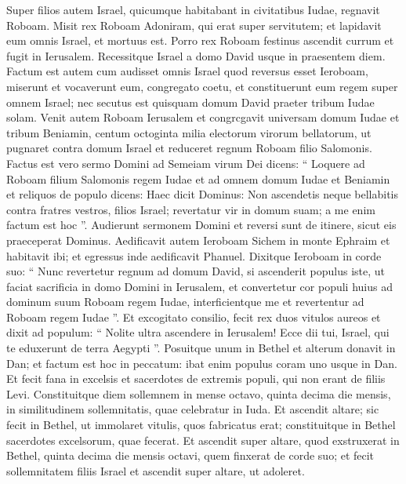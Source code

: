 \begin{biblechapter}
\begin{biblechapter}
\begin{biblechapter}
\begin{biblechapter}
\begin{biblechapter}
\begin{biblechapter}
\begin{biblechapter}
\begin{biblechapter}
\begin{biblechapter}
\begin{biblechapter}
\begin{biblechapter}
\begin{biblechapter}
\verse Super filios autem Israel, quicumque habitabant in civitatibus Iudae, regnavit Roboam. 
\verse Misit rex Roboam Adoniram, qui erat super servitutem; et lapidavit eum omnis Israel, et mortuus est. Porro rex Roboam festinus ascendit currum et fugit in Ierusalem. 
\verse Recessitque Israel a domo David usque in praesentem diem.
 \verse Factum est autem cum audisset omnis Israel quod reversus esset Ieroboam, miserunt et vocaverunt eum, congregato coetu, et constituerunt eum regem super omnem Israel; nec secutus est quisquam domum David praeter tribum Iudae solam.
 \verse Venit autem Roboam Ierusalem et congrcgavit universam domum Iudae et tribum Beniamin, centum octoginta milia electorum virorum bellatorum, ut pugnaret contra domum Israel et reduceret regnum Roboam filio Salomonis. 
\verse Factus est vero sermo Domini ad Semeiam virum Dei dicens: 
\verse “ Loquere ad Roboam filium Salomonis regem Iudae et ad omnem domum Iudae et Beniamin et reliquos de populo dicens: 
\verse Haec dicit Dominus: Non ascendetis neque bellabitis contra fratres vestros, filios Israel; revertatur vir in domum suam; a me enim factum est hoc ”. Audierunt sermonem Domini et reversi sunt de itinere, sicut eis praeceperat Dominus.
 \verse Aedificavit autem Ieroboam Sichem in monte Ephraim et habitavit ibi; et egressus inde aedificavit Phanuel.
 \verse Dixitque Ieroboam in corde suo: “ Nunc revertetur regnum ad domum David, 
 \verse si ascenderit populus iste, ut faciat sacrificia in domo Domini in Ierusalem, et convertetur cor populi huius ad dominum suum Roboam regem Iudae, interficientque me et revertentur ad Roboam regem Iudae ”. 
\verse Et excogitato consilio, fecit rex duos vitulos aureos et dixit ad populum: “ Nolite ultra ascendere in Ierusalem! Ecce dii tui, Israel, qui te eduxerunt de terra Aegypti ”. 
\verse Posuitque unum in Bethel et alterum donavit in Dan; 
\verse et factum est hoc in peccatum: ibat enim populus coram uno usque in Dan. 
\verse Et fecit fana in excelsis et sacerdotes de extremis populi, qui non erant de filiis Levi. 
 \verse Constituitque diem sollemnem in mense octavo, quinta decima die mensis, in similitudinem sollemnitatis, quae celebratur in Iuda. Et ascendit altare; sic fecit in Bethel, ut immolaret vitulis, quos fabricatus erat; constituitque in Bethel sacerdotes excelsorum, quae fecerat. 
\verse Et ascendit super altare, quod exstruxerat in Bethel, quinta decima die mensis octavi, quem finxerat de corde suo; et fecit sollemnitatem filiis Israel et ascendit super altare, ut adoleret.
 

\end{biblechapter}
\end{biblechapter}
\end{biblechapter}
\end{biblechapter}
\end{biblechapter}
\end{biblechapter}
\end{biblechapter}
\end{biblechapter}
\end{biblechapter}
\end{biblechapter}
\end{biblechapter}
\end{biblechapter}
